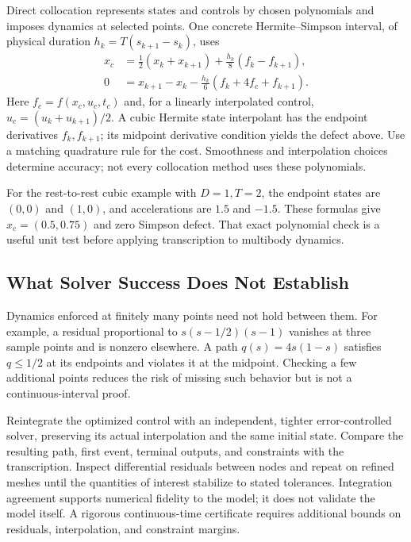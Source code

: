 \documentclass[12pt, openany]{book}
\theoremstyle{plain}
\begin{document}
Direct collocation represents states and controls by chosen polynomials
and imposes dynamics at selected points. One concrete Hermite--Simpson
interval, of physical duration $h_k=T(s_{k+1}-s_k)$, uses
\begin{equation}\label{eq:hermite_simpson}
 \begin{aligned}
 x_c&=\tfrac12(x_k+x_{k+1})+\tfrac{h_k}{8}(f_k-f_{k+1}),\\
 0&=x_{k+1}-x_k-\tfrac{h_k}{6}(f_k+4f_c+f_{k+1}).
 \end{aligned}
\end{equation}
Here $f_c=f(x_c,u_c,t_c)$ and, for a linearly interpolated control,
$u_c=(u_k+u_{k+1})/2$. A cubic Hermite state interpolant has the endpoint
derivatives $f_k,f_{k+1}$; its midpoint derivative condition yields the defect
above. Use a matching quadrature rule for the cost. Smoothness and interpolation
choices determine accuracy; not every collocation method uses these polynomials.

For the rest-to-rest cubic example with $D=1,T=2$, the endpoint states are
$(0,0)$ and $(1,0)$, and accelerations are $1.5$ and $-1.5$. These formulas
give $x_c=(0.5,0.75)$ and zero Simpson defect. That exact polynomial check
is a useful unit test before applying transcription to multibody dynamics.

\subsection{What Solver Success Does Not Establish}

Dynamics enforced at finitely many points need not hold between them. For
example, a residual proportional to $s(s-1/2)(s-1)$ vanishes at three sample
points and is nonzero elsewhere. A path $q(s)=4s(1-s)$ satisfies
$q\leq1/2$ at its endpoints and violates it at the midpoint. Checking a few
additional points reduces the risk of missing such behavior but is not a
continuous-interval proof.

Reintegrate the optimized control with an independent, tighter error-controlled
solver, preserving its actual interpolation and the same initial state.
Compare the resulting path, first event, terminal outputs, and constraints
with the transcription. Inspect differential residuals between nodes and
repeat on refined meshes until the quantities of interest stabilize to stated
tolerances. Integration agreement supports numerical fidelity to the model;
it does not validate the model itself. A rigorous continuous-time certificate
requires additional bounds on residuals, interpolation, and constraint margins.
\end{document}
